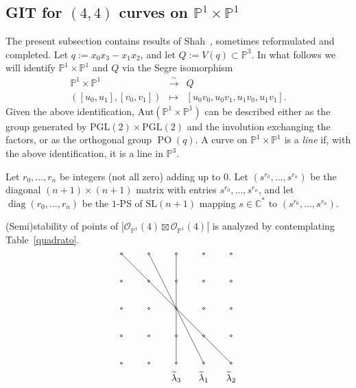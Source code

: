 \documentclass[11pt]{amsart}
\numberwithin{equation}{section}
\theoremstyle{plain}
\theoremstyle{remark}
\theoremstyle{definition}
\newcommand{\bP}{\mathbb{P}}
\newcommand{\Aut}{\mathrm{Aut}}
\newcommand{\PGL}{\mathrm{PGL}}
\newcommand{\SL}{\mathrm{SL}}
\DeclareMathOperator{\PO}{PO}
\newcommand{\CC}{{\mathbb C}}
\newcommand{\cO}{{\mathscr O}}
\newcommand{\lra}{\longrightarrow}
\newcommand{\PP}{{\mathbb P}}
\newcommand{\wt}{\widetilde}
\DeclareMathOperator{\diag}{diag}
\begin{document}
\subsection{GIT for $(4,4)$ curves on $\bP^1\times\bP^1$} 
%
The present subsection contains results of Shah~\cite{shah}, sometimes reformulated and completed. Let  $q:=x_0x_3-x_1x_2$, and let $Q:=V(q)\subset\PP^3$. In what follows we will  identify 
  $\bP^1\times\bP^1$ and $Q$ via the Segre isomorphism 
%
\begin{equation}
%
\begin{matrix}
%
\bP^1\times\bP^1 & \overset{\sim}{\lra} & Q \\
%
([u_0,u_1],[v_0,v_1]) & \mapsto & [u_0v_0,u_0v_1,u_1v_0,u_1 v_1].
%
\end{matrix}
%
\end{equation}
%
Given the above identification, $\Aut(\bP^1\times\bP^1)$ can be described either as the group generated by $\PGL(2)\times\PGL(2)$ and the involution exchanging the factors, or 
 as the orthogonal group  $\PO(q)$. A curve on $\bP^1\times\bP^1 $ is a \emph{line} if, with the above identification,  it is a line in $\PP^3$.

Let $r_0,\ldots,r_n$ be integers (not all zero) adding up to $0$. Let $(s^{r_0},\ldots,s^{r_n})$ be  the diagonal $(n+1)\times(n+1)$ matrix with entries $s^{r_0},\ldots,s^{r_n}$, and 
let $\diag(r_0,\ldots,r_n)$   be the $1$-PS of  $\SL(n+1)$ mapping $s\in\CC^{*}$ to  $(s^{r_0},\ldots,s^{r_n})$. 

(Semi)stability of points of $|\cO_{\PP^1}(4)\boxtimes\cO_{\PP^1}(4)|$ is analyzed by contemplating Table~\ref{quadrato}.
\bigskip
%
\begin{equation}\label{quadrato}
 \centering
\xy
(20,5) *{\wt{\lambda}_3},
(30,5) *{\wt{\lambda}_1},
(40,5) *{\wt{\lambda}_2},
\POS(0,10) *\cir<1pt>{}="a",
\POS(0,20) *\cir<1pt>{}="b",
\POS(0,30) *\cir<1pt>{}="c",
\POS(0,40) *\cir<1pt>{}="d",
\POS(0,50) *\cir<1pt>{}="e",
\POS(10,10) *\cir<1pt>{}="f",
\POS(10,20) *\cir<1pt>{}="g",
\POS(10,30) *\cir<1pt>{}="h",
\POS(10,40) *\cir<1pt>{}="i",
\POS(10,50) *\cir<1pt>{}="j",
\POS(20,10) *\cir<1pt>{}="k",
\POS(20,20) *\cir<1pt>{}="l"
\POS(20,30) *\cir<1pt>{}="m"
\POS(20,40) *\cir<1pt>{}="n"
\POS(20,50) *\cir<1pt>{}="o"
\POS(30,10) *\cir<1pt>{}="p",
\POS(30,20) *\cir<1pt>{}="q"
\POS(30,30) *\cir<1pt>{}="r"
\POS(30,40) *\cir<1pt>{}="s"
\POS(30,50) *\cir<1pt>{}="t"
\POS(40,10) *\cir<1pt>{}="u",
\POS(40,20) *\cir<1pt>{}="v"
\POS(40,30) *\cir<1pt>{}="w"
\POS(40,40) *\cir<1pt>{}="x"
\POS(40,50) *\cir<1pt>{}="y"
\POS "e" \ar@{-} "i",
\POS "i" \ar@{-} "m",
\POS "m" \ar@{-} "q",
\POS "q" \ar@{-} "u",
\POS "j" \ar@{-} "m",
\POS "m" \ar@{-} "p",
\POS "o" \ar@{-} "n",
\POS "n" \ar@{-} "m",
\POS "m" \ar@{-} "l",
\POS "l" \ar@{-} "k",
\endxy 
%
\end{equation}
%
\bigskip
\end{document}
